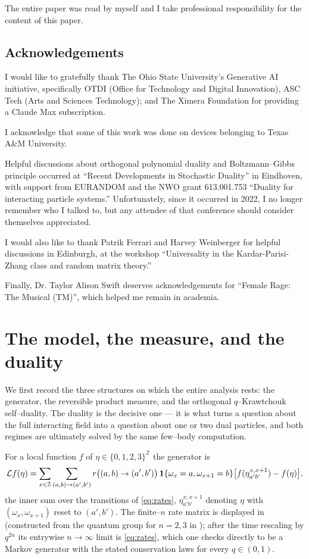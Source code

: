 \documentclass[11pt]{article}
\theoremstyle{plain}
\theoremstyle{definition}
\theoremstyle{remark}
\newcommand{\Z}{\mathbb{Z}}\newcommand{\R}{\mathbb{R}}\newcommand{\N}{\mathbb{N}}
\newcommand{\cL}{\mathcal L}\newcommand{\cO}{\mathcal O}\newcommand{\cE}{\mathcal E}
\begin{document}
The entire paper was read by myself and I take professional responsibility for the content of this paper. 

\subsection{Acknowledgements}

I would like to gratefully thank The Ohio State University's Generative AI initiative, specifically OTDI (Office for Technology and Digital Innovation), ASC Tech (Arts and Sciences Technology); and The Ximera Foundation for providing a Claude Max subscription.

I acknowledge that some of this work was done on devices belonging to Texas A\&M University.

Helpful discussions about orthogonal polynomial duality and Boltzmann–Gibbs principle occurred at ``Recent Developments in Stochastic Duality'' in Eindhoven, with support from EURANDOM and the NWO grant 613.001.753 ``Duality for interacting particle systems.'' Unfortunately, since it occurred in 2022, I no longer remember who I talked to, but any attendee of that conference should consider themselves appreciated.
 
I would also like to thank Patrik Ferrari and Harvey Weinberger for helpful discussions in Edinburgh, at the workshop ``Universality in the Kardar-Parisi-Zhang class and random matrix theory.''

Finally, Dr. Taylor Alison Swift deserves acknowledgements for ``Female Rage: The Musical (TM)'', which helped me remain in academia. 



\section{The model, the measure, and the duality}\label{sec:model}

We first record the three structures on which the entire analysis rests: the generator,
the reversible product measure, and the orthogonal $q$--Krawtchouk self--duality. The
duality is the decisive one --- it is what turns a question about the full interacting
field into a question about one or two dual particles, and both regimes are ultimately
solved by the same few--body computation.

For a local function $f$ of $\eta\in\{0,1,2,3\}^\Z$ the generator is
\begin{equation}\label{eq:gen}
  \cL f(\eta)=\sum_{x\in\Z}\sum_{(a,b)\to(a',b')}
   r\big((a,b)\to(a',b')\big)\,\bone\{\omega_x=a,\omega_{x+1}=b\}
   \big[f(\eta^{x,x+1}_{a'b'})-f(\eta)\big],
\end{equation}
the inner sum over the transitions of \eqref{eq:rates}, $\eta^{x,x+1}_{a'b'}$ denoting
$\eta$ with $(\omega_x,\omega_{x+1})$ reset to $(a',b')$. The finite--$n$ rate matrix
is displayed in \cite[\S2.1]{REU} (constructed from the quantum group for $n=2,3$ in
\cite{KLLPZ}); after the time rescaling by $q^{2n}$ its entrywise $n\to\infty$ limit
is \eqref{eq:rates}, which one checks directly to be a Markov generator with the
stated conservation laws for every $q\in(0,1)$.
\end{document}

